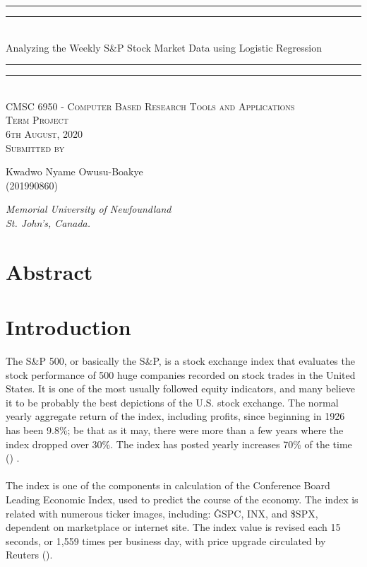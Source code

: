 \documentclass[12pt]{article}
\begin{document}
{\centering

\rule{\textwidth}{1.6pt}\vspace*{-\baselineskip}\vspace*{2pt} 
\rule{\textwidth}{0.4pt}\\[\baselineskip] 
{\LARGE Analyzing the Weekly S\&P Stock Market Data using Logistic Regression}
\rule{\textwidth}{0.4pt}\vspace*{-\baselineskip}\vspace{3.2pt}
\rule{\textwidth}{1.6pt}\\[\baselineskip] 

\vspace{20mm} %
\scshape %
CMSC 6950 - Computer Based Research Tools and Applications \\ [\baselineskip]
Term Project \\[\baselineskip] 
6th August, 2020 \\[\baselineskip] 
\vspace{20mm} %
Submitted by \\[\baselineskip]
{\Large Kwadwo Nyame Owusu-Boakye \\ (201990860) \par}
\vfill
{\itshape Memorial University of Newfoundland \\ St. John's, Canada.\par} 
}

\newpage

{\centering
  \section*{Abstract}
}


\section{Introduction}
The S\&P 500, or basically the S\&P, is a stock exchange index that evaluates the stock performance of 500 huge companies recorded on stock trades in the United States. It is one of the most usually followed equity indicators, and many believe it to be probably the best depictions of the U.S. stock exchange. The normal yearly aggregate return of the index, including profits, since beginning in 1926 has been 9.8\%; be that as it may, there were more than a few years where the index dropped over 30\%. The index has posted yearly increases 70\% of the time (\cite{ref-wiki}) .\\\\
The index is one of the components in calculation of the Conference Board Leading Economic Index, used to predict the course of the economy. The index is related with numerous ticker images, including: \^GSPC, INX, and \$SPX, dependent on marketplace or internet site. The index value is revised each 15 seconds, or 1,559 times per business day, with price upgrade circulated by Reuters (\cite{ref-quote}).
\end{document}
